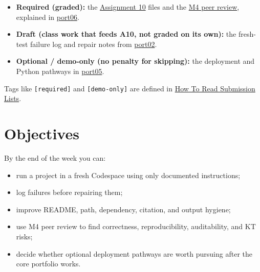 \documentclass[
  letterpaper,
  DIV=11,
  numbers=noendperiod,
  oneside]{scrreprt}
\providecommand{\tightlist}{%
  \setlength{\itemsep}{0pt}\setlength{\parskip}{0pt}}
\begin{document}
\begin{tcolorbox}[enhanced jigsaw, title=\textcolor{quarto-callout-important-color}{\faExclamation}\hspace{0.5em}{Required / Draft / Optional This Week}, arc=.35mm, toptitle=1mm, colframe=quarto-callout-important-color-frame, toprule=.15mm, leftrule=.75mm, bottomtitle=1mm, opacityback=0, bottomrule=.15mm, coltitle=black, breakable, opacitybacktitle=0.6, titlerule=0mm, colback=white, left=2mm, colbacktitle=quarto-callout-important-color!10!white, rightrule=.15mm]

\begin{itemize}
\tightlist
\item
  \textbf{Required (graded):} the
  \href{../../assignments/assignment10-portfolio-surgery/README.md}{Assignment
  10} files and the \href{../../milestones/m4-peer-review/README.md}{M4
  peer review}, explained in
  \href{port06-assignment-a10-final-portfolio.qmd}{port06}.
\item
  \textbf{Draft (class work that feeds A10, not graded on its own):} the
  fresh-test failure log and repair notes from
  \href{port02-fresh-codespace-test.qmd}{port02}.
\item
  \textbf{Optional / demo-only (no penalty for skipping):} the
  deployment and Python pathways in
  \href{port05-optional-pathways.qmd}{port05}.
\end{itemize}

Tags like \texttt{{[}required{]}} and \texttt{{[}demo-only{]}} are
defined in \hyperref[how-to-read-submission-lists]{How To Read
Submission Lists}.

\end{tcolorbox}

\section*{Objectives}\label{objectives-5}


By the end of the week you can:

\begin{itemize}
\tightlist
\item
  run a project in a fresh Codespace using only documented instructions;
\item
  log failures before repairing them;
\item
  improve README, path, dependency, citation, and output hygiene;
\item
  use M4 peer review to find correctness, reproducibility, auditability,
  and KT risks;
\item
  decide whether optional deployment pathways are worth pursuing after
  the core portfolio works.
\end{itemize}
\end{document}
